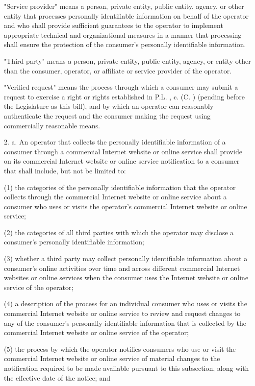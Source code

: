      "Service provider" means a person, private entity, public entity, agency, or other entity that processes personally identifiable information on behalf of the operator and who shall provide sufficient guarantees to the operator to implement appropriate technical and organizational measures in a manner that processing shall ensure the protection of the consumer's personally identifiable information.

     "Third party" means a person, private entity, public entity, agency, or entity other than the consumer, operator, or affiliate or service provider of the operator.

     "Verified request" means the process through which a consumer may submit a request to exercise a right or rights established in P.L.    , c.    (C.      ) (pending before the Legislature as this bill), and by which an operator can reasonably authenticate the request and the consumer making the request using commercially reasonable means.

 

     2.    a.   An operator that collects the personally identifiable information of a consumer through a commercial Internet website or online service shall provide on its commercial Internet website or online service notification to a consumer that shall include, but not be limited to:

     (1)   the categories of the personally identifiable information that the operator collects through the commercial Internet website or online service about a consumer who uses or visits the operator's commercial Internet website or online service;

     (2)   the categories of all third parties with which the operator may disclose a consumer's personally identifiable information;

     (3)   whether a third party may collect personally identifiable information about a consumer's online activities over time and across different commercial Internet websites or online services when the consumer uses the Internet website or online service of the operator;

     (4)   a description of the process for an individual consumer who uses or visits the commercial Internet website or online service to review and request changes to any of the consumer's personally identifiable information that is collected by the commercial Internet website or online service of the operator;

     (5)   the process by which the operator notifies consumers who use or visit the commercial Internet website or online service of material changes to the notification required to be made available pursuant to this subsection, along with the effective date of the notice; and

